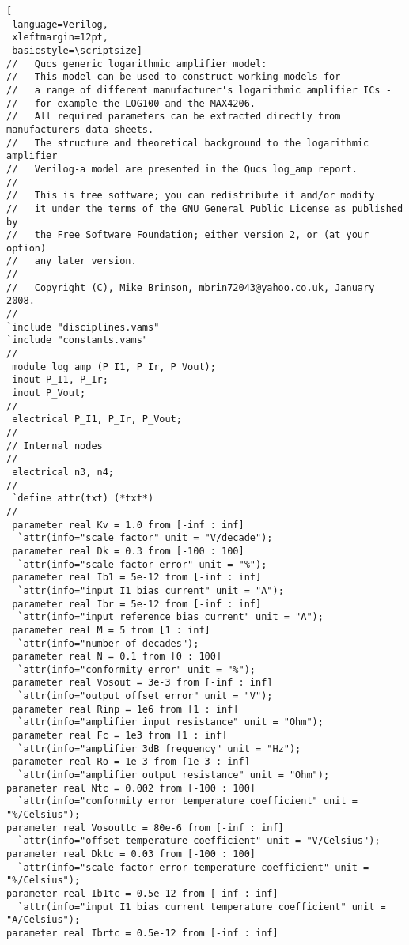 \begin{lstlisting}[
 language=Verilog, 
 xleftmargin=12pt,
 basicstyle=\scriptsize]
//   Qucs generic logarithmic amplifier model:
//   This model can be used to construct working models for
//   a range of different manufacturer's logarithmic amplifier ICs - 
//   for example the LOG100 and the MAX4206. 
//   All required parameters can be extracted directly from manufacturers data sheets.
//   The structure and theoretical background to the logarithmic amplifier
//   Verilog-a model are presented in the Qucs log_amp report.
//
//   This is free software; you can redistribute it and/or modify
//   it under the terms of the GNU General Public License as published by
//   the Free Software Foundation; either version 2, or (at your option)
//   any later version.
// 
//   Copyright (C), Mike Brinson, mbrin72043@yahoo.co.uk, January 2008.
//
`include "disciplines.vams"
`include "constants.vams"
// 
 module log_amp (P_I1, P_Ir, P_Vout);
 inout P_I1, P_Ir;
 inout P_Vout;
//
 electrical P_I1, P_Ir, P_Vout;
//
// Internal nodes
//
 electrical n3, n4;
//
 `define attr(txt) (*txt*)
//
 parameter real Kv = 1.0 from [-inf : inf]
  `attr(info="scale factor" unit = "V/decade");
 parameter real Dk = 0.3 from [-100 : 100]
  `attr(info="scale factor error" unit = "%");
 parameter real Ib1 = 5e-12 from [-inf : inf]
  `attr(info="input I1 bias current" unit = "A");
 parameter real Ibr = 5e-12 from [-inf : inf]
  `attr(info="input reference bias current" unit = "A");
 parameter real M = 5 from [1 : inf]
  `attr(info="number of decades");
 parameter real N = 0.1 from [0 : 100]
  `attr(info="conformity error" unit = "%");
 parameter real Vosout = 3e-3 from [-inf : inf]
  `attr(info="output offset error" unit = "V");
 parameter real Rinp = 1e6 from [1 : inf]
  `attr(info="amplifier input resistance" unit = "Ohm");
 parameter real Fc = 1e3 from [1 : inf]
  `attr(info="amplifier 3dB frequency" unit = "Hz");
 parameter real Ro = 1e-3 from [1e-3 : inf]
  `attr(info="amplifier output resistance" unit = "Ohm");
parameter real Ntc = 0.002 from [-100 : 100]
  `attr(info="conformity error temperature coefficient" unit = "%/Celsius");
parameter real Vosouttc = 80e-6 from [-inf : inf]
  `attr(info="offset temperature coefficient" unit = "V/Celsius");
parameter real Dktc = 0.03 from [-100 : 100]
  `attr(info="scale factor error temperature coefficient" unit = "%/Celsius");
parameter real Ib1tc = 0.5e-12 from [-inf : inf]
  `attr(info="input I1 bias current temperature coefficient" unit = "A/Celsius");
parameter real Ibrtc = 0.5e-12 from [-inf : inf]

\end{lstlisting}
